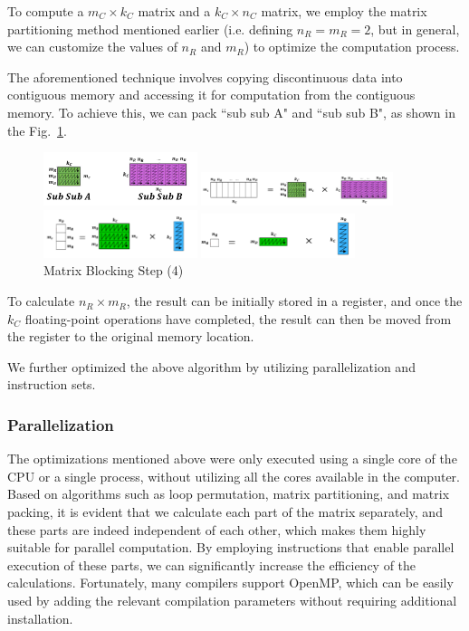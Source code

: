 \documentclass[conference]{IEEEtran}
\begin{document}
	To compute a $m_C \times k_C$ matrix and a $k_C \times n_C$ matrix, we employ the matrix partitioning method mentioned earlier (i.e. defining $n_R = m_R = 2$, but in general, we can customize the values of $n_R$ and $m_R$) to optimize the computation process.
	
	The aforementioned technique involves copying discontinuous data into contiguous memory and accessing it for computation from the contiguous memory. To achieve this, we can pack ``sub sub A" and ``sub sub B", as shown in the Fig.~\ref{matrixBlockingStep4}.
	
	\begin{figure}[htbp]
		\centerline{\includegraphics[width=0.4\textwidth]{fig6-1.png}}
		\centerline{\includegraphics[width=0.5\textwidth]{fig6-2.png}}
		\centerline{\includegraphics[width=0.4\textwidth]{fig6-3.png}}
		\centerline{\includegraphics[width=0.4\textwidth]{fig6-4.png}}
		\caption{Matrix Blocking Step (4)}
		\label{matrixBlockingStep4}
	\end{figure}

	To calculate $n_R \times m_R$, the result can be initially stored in a register, and once the $k_C$ floating-point operations have completed, the result can then be moved from the register to the original memory location.
	
	We further optimized the above algorithm by utilizing parallelization and instruction sets.
	
	\subsubsection{Parallelization}
	The optimizations mentioned above were only executed using a single core of the CPU or a single process, without utilizing all the cores available in the computer. Based on algorithms such as loop permutation, matrix partitioning, and matrix packing, it is evident that we calculate each part of the matrix separately, and these parts are indeed independent of each other, which makes them highly suitable for parallel computation. By employing instructions that enable parallel execution of these parts, we can significantly increase the efficiency of the calculations. Fortunately, many compilers support OpenMP, which can be easily used by adding the relevant compilation parameters without requiring additional installation.
\end{document}
